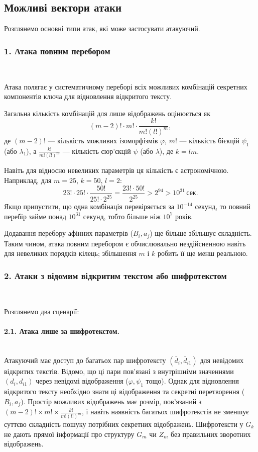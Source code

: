 \subsection{Можливі вектори атаки}
\label{subsec:attack_vectors}
Розглянемо основні типи атак, які може застосувати атакуючий.

\subsubsection{1. Атака повним перебором} \\
\label{subsubsec:brute_force}

Атака полягає у систематичному переборі всіх можливих комбінацій секретних компонентів ключа для відновлення відкритого тексту.

Загальна кількість комбінацій для лише відображень оцінюється як
\[
(m-2)!\cdot m! \cdot \frac{k!}{m!(l!)^m},
\]
де $(m-2)!$ — кількість можливих ізоморфізмів $\varphi$, $m!$ — кількість бієкцій $\psi_1$ (або $\lambda_1$), а $\frac{k!}{m!(l!)^m}$ — кількість сюр'єкцій $\psi$ (або $\lambda$), де $k=lm$.

Навіть для відносно невеликих параметрів ця кількість є астрономічною.
Наприклад, для $m=25$, $k=50$, $l=2$:
\begin{equation*}
    23! \cdot 25! \cdot \frac{50!}{25! \cdot 2^{25}} = \frac{23! \cdot 50!}{2^{25}} > 2^{94} > 10^{31}\, \text{сек}.
\end{equation*}
Якщо припустити, що одна комбінація перевіряється за $10^{-14}$ секунд, то повний перебір займе понад $10^{31}$ секунд, тобто більше ніж $10^7$ років.

Додавання перебору афінних параметрів ($B_i, a_j$) ще більше збільшує складність.
Таким чином, атака повним перебором є обчислювально нездійсненною навіть для невеликих порядків кілець; збільшення $m$ і $k$ робить її ще менш реальною.

\subsubsection{2. Атаки з відомим відкритим текстом або шифротекстом} \\
\label{subsubsec:known_plaintext}

Розглянемо два сценарії:

\paragraph{2.1. Атака лише за шифротекстом.} \\
Атакуючий має доступ до багатьох пар шифротексту $(\bar{d}_i, \bar{d}_{i1})$ для невідомих відкритих текстів. Відомо, що ці пари пов'язані з внутрішніми значеннями $(d_i, d_{i1})$ через невідомі відображення ($\varphi, \psi_1$ тощо). Однак для відновлення відкритого тексту необхідно знати ці відображення та секретні перетворення ($B_i, a_j$). Простір можливих відображень має розмір, пов'язаний з $(m-2)! \times m! \times \frac{k!}{m!(l!)^m}$, і навіть наявність багатьох шифротекстів не зменшує суттєво складність пошуку потрібних секретних відображень. Шифротексти у $G_k$ не дають прямої інформації про структуру $G_m$ чи $Z_m$ без правильних зворотних відображень.

